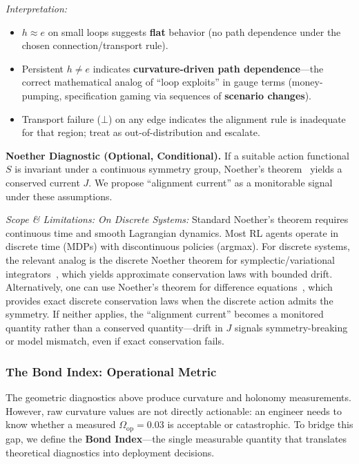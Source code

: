 \documentclass[12pt]{article}
\begin{document}
\emph{Interpretation:}
\begin{itemize}
\item $h \approx e$ on small loops suggests \textbf{flat} behavior (no path dependence under the chosen connection/transport rule).
\item Persistent $h \neq e$ indicates \textbf{curvature-driven path dependence}---the correct mathematical
analog of ``loop exploits'' in gauge terms (money-pumping, specification gaming via sequences
of \textbf{scenario changes}).
\item Transport failure ($\bot$) on any edge indicates the alignment rule is inadequate for that region;
treat as out-of-distribution and escalate.
\end{itemize}

\textbf{Noether Diagnostic (Optional, Conditional).} If a suitable action functional $S$ is invariant
under a continuous symmetry group, Noether's theorem~\cite{noether1918} yields a conserved current $J$. We
propose ``alignment current'' as a monitorable signal under these assumptions.

\emph{Scope \& Limitations: On Discrete Systems:} Standard Noether's theorem requires continuous
time and smooth Lagrangian dynamics. Most RL agents operate in discrete time (MDPs) with
discontinuous policies (argmax). For discrete systems, the relevant analog is the discrete Noether
theorem for symplectic/variational integrators~\cite{marsden2001}, which yields approximate conservation laws
with bounded drift. Alternatively, one can use Noether's theorem for difference equations~\cite{logan1973,dorodnitsyn2001},
which provides exact discrete conservation laws when the discrete action admits the symmetry.
If neither applies, the ``alignment current'' becomes a monitored quantity rather than a conserved
quantity---drift in $J$ signals symmetry-breaking or model mismatch, even if exact conservation fails.

\subsubsection{The Bond Index: Operational Metric}
\label{sec:bondindex}

The geometric diagnostics above produce curvature and holonomy measurements. However, raw
curvature values are not directly actionable: an engineer needs to know whether a measured $\Omega_{\text{op}} =
0.03$ is acceptable or catastrophic. To bridge this gap, we define the \textbf{Bond Index}---the single
measurable quantity that translates theoretical diagnostics into deployment decisions.
\end{document}
